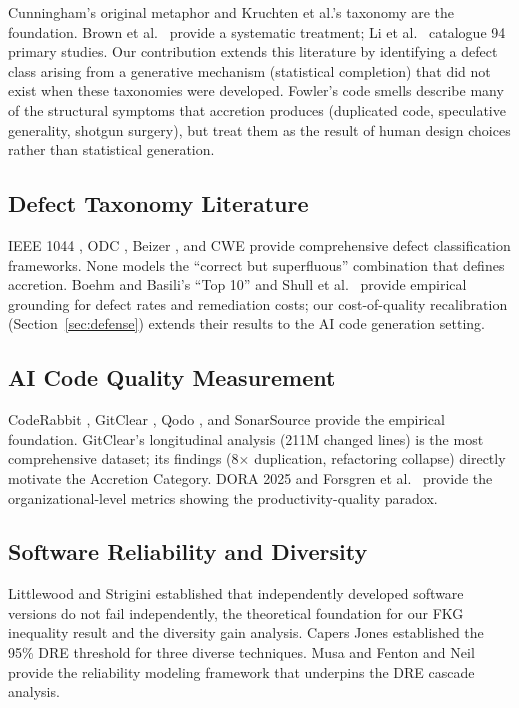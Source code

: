 \documentclass[11pt, a4paper, logo, copyright]{googledeepmind}
\begin{document}
Cunningham's original metaphor \citep{cunningham1992} and Kruchten et al.'s taxonomy \citep{kruchten2012} are the foundation. Brown et al.\ \citep{brown2010} provide a systematic treatment; Li et al.\ \citep{li2015} catalogue 94 primary studies. Our contribution extends this literature by identifying a defect class arising from a generative mechanism (statistical completion) that did not exist when these taxonomies were developed. Fowler's code smells \citep{fowler1999} describe many of the structural symptoms that accretion produces (duplicated code, speculative generality, shotgun surgery), but treat them as the result of human design choices rather than statistical generation.

\subsection{Defect Taxonomy Literature}

IEEE 1044 \citep{ieee1044}, ODC \citep{chillarege1992}, Beizer \citep{beizer1990}, and CWE \citep{cwe2024} provide comprehensive defect classification frameworks. None models the ``correct but superfluous'' combination that defines accretion. Boehm and Basili's ``Top 10'' \citep{boehm2001} and Shull et al.\ \citep{shull2002} provide empirical grounding for defect rates and remediation costs; our cost-of-quality recalibration (Section~\ref{sec:defense}) extends their results to the AI code generation setting.

\subsection{AI Code Quality Measurement}

CodeRabbit \citep{coderabbit2025}, GitClear \citep{gitclear2025}, Qodo \citep{qodo2025}, and SonarSource \citep{sonar2026} provide the empirical foundation. GitClear's longitudinal analysis (211M changed lines) is the most comprehensive dataset; its findings (8$\times$ duplication, refactoring collapse) directly motivate the Accretion Category. DORA 2025 \citep{dora2025} and Forsgren et al.\ \citep{forsgren2018accelerate} provide the organizational-level metrics showing the productivity-quality paradox.

\subsection{Software Reliability and Diversity}

Littlewood and Strigini \citep{littlewood1993, littlewood2000} established that independently developed software versions do not fail independently, the theoretical foundation for our FKG inequality result and the diversity gain analysis. Capers Jones \citep{capersjones2012} established the 95\% DRE threshold for three diverse techniques. Musa \citep{musa1987} and Fenton and Neil \citep{fenton1999} provide the reliability modeling framework that underpins the DRE cascade analysis.
\end{document}
